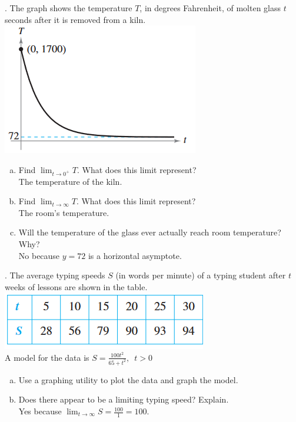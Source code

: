 \documentclass[11pt]{article}
\newcommand*{\vs}{\vspace{1cm}}
\newcommand*{\next}{\noindent}
\begin{document}
\vs\next
90. The graph shows the temperature $T$, in degrees Fahrenheit, of molten glass $t$ seconds after it is removed from a kiln.\\
\includegraphics{90.png}
\begin{enumerate}[(a)]
    \item Find $\lim_{t\to 0^+}T$. What does this limit represent?\\
    \indent The temperature of the kiln.
    \item Find $\lim_{t\to\infty}T$. What does this limit represent?\\
    \indent The room's temperature.
    \item Will the temperature of the glass ever actually reach room temperature? Why?\\
    \indent No because $y=72$ is a horizontal asymptote.
\end{enumerate}

\vs\next
92. The average typing speeds $S$ (in words per minute) of a typing student after $t$ weeks of lessons are shown in the table.\\
 \includegraphics{92.png}\\
 A model for the data is $S=\frac{100t^2}{65+t^2},\,\,\, t>0$
 \begin{enumerate}[(a)]
    \item Use a graphing utility to plot the data and graph the model.
    \item Does there appear to be a limiting typing speed? Explain.\\
    \indent Yes because $\lim_{t\to\infty}S=\frac{100}{1}=100$. 
 \end{enumerate}
\end{document}

